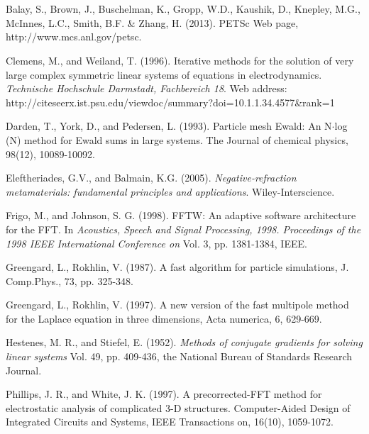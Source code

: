 \documentclass[12pt]{elsarticle}
\numberwithin{equation}{section}
\begin{document}
\section*{\refname}

\begin{thebibliography}{0}
 Balay, S., Brown, J., Buschelman, K., Gropp, W.D., Kaushik, D., Knepley, M.G., McInnes, L.C., Smith, B.F. \& Zhang, H. (2013). {PETSc} {W}eb page, http://www.mcs.anl.gov/petsc.

 Clemens, M., and Weiland, T. (1996). Iterative methods for the solution of very large complex symmetric linear systems of equations in electrodynamics. \textit{Technische Hochschule Darmstadt, Fachbereich 18}. Web address: http://citeseerx.ist.psu.edu/viewdoc/summary?doi=10.1.1.34.4577\&rank=1

 Darden, T., York, D., and Pedersen, L. (1993). Particle mesh Ewald: An N$\cdot$log (N) method for Ewald sums in large systems. The Journal of chemical physics, 98(12), 10089-10092.

 Eleftheriades, G.V., and Balmain, K.G. (2005). \textit{Negative-refraction metamaterials: fundamental principles and applications}. Wiley-Interscience.

 Frigo, M., and Johnson, S. G. (1998). FFTW: An adaptive software architecture for the FFT. In \textit{Acoustics, Speech and Signal Processing, 1998. Proceedings of the 1998 IEEE International Conference on} Vol. 3, pp. 1381-1384, IEEE.

 Greengard, L., Rokhlin, V. (1987). A fast algorithm for particle simulations,
J. Comp.Phys., 73, pp. 325-348. 

  Greengard, L., Rokhlin, V. (1997). A new version of the fast multipole method for the Laplace equation in three dimensions, Acta numerica, 6, 629-669.

 Hestenes, M. R., and Stiefel, E. (1952). \textit{Methods of conjugate gradients for solving linear systems} Vol. 49, pp. 409-436, the National Bureau of Standards Research Journal.

 Phillips, J. R., and White, J. K. (1997). A precorrected-FFT method for electrostatic analysis of complicated 3-D structures. Computer-Aided Design of Integrated Circuits and Systems, IEEE Transactions on, 16(10), 1059-1072.


\end{thebibliography}
\end{document}
